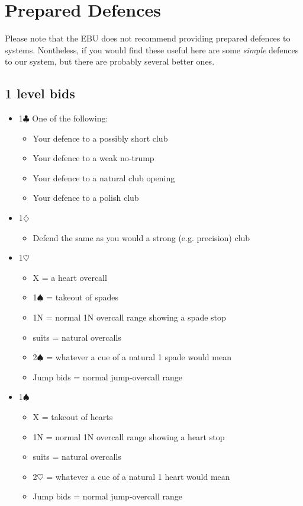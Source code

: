 \section{Prepared Defences}
\label{appx:defences}

Please note that the EBU does not recommend providing prepared defences to
systems.  Nontheless, if you would find these useful here are some {\em simple}
defences to our system, but there are probably several better ones.

\subsection{1 level bids}

\begin{itemize}
\item 1$\clubsuit$
	One of the following:
	\begin{itemize}
	\item Your defence to a possibly short club
	\item Your defence to a weak no-trump
	\item Your defence to a natural club opening 
	\item Your defence to a polish club
	\end{itemize}
\item 1$\diamondsuit$
	\begin{itemize}
	\item Defend the same as you would a strong (e.g. precision) club
	\end{itemize}
\item 1$\heartsuit$
	\begin{itemize}
	\item X = a heart overcall
	\item 1$\spadesuit$ = takeout of spades
	\item 1N = normal 1N overcall range showing a spade stop
	\item suits = natural overcalls
	\item 2$\spadesuit$ = whatever a cue of a natural 1 spade would mean 
	\item Jump bids = normal jump-overcall range
	\end{itemize}
\item 1$\spadesuit$
	\begin{itemize}
	\item X = takeout of hearts
	\item 1N = normal 1N overcall range showing a heart stop
	\item suits = natural overcalls
	\item 2$\heartsuit$ = whatever a cue of a natural 1 heart would mean 
	\item Jump bids = normal jump-overcall range
	\end{itemize}


\end{itemize}
